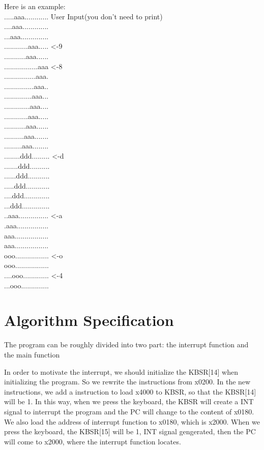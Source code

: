 \documentclass[twoside]{article}
\begin{document}
\begin{CJK*}{UTF8}{gbsn}
	Here is an example:\\
	.....aaa............ User Input(you don't need to print)\\ ....aaa............. \\...aaa..............\\ ............aaa..... <-9\\ ...........aaa...... \\.................aaa <-8\\ ................aaa. \\...............aaa.. \\..............aaa...\\ .............aaa....\\ ............aaa.....\\ ...........aaa...... \\..........aaa....... \\.........aaa........\\ ........ddd......... <-d\\ .......ddd..........\\ ......ddd...........\\ .....ddd............ \\....ddd.............\\ ...ddd.............. \\..aaa............... <-a \\.aaa................\\ aaa.................\\ aaa................. \\ooo................. <-o\\ ooo.................\\ ....ooo............. <-4\\ ...ooo..............\\
	
	\section{Algorithm Specification}
	The program can be roughly divided into two part: the interrupt function and the main function
	
	In order to motivate the interrupt, we should initialize the KBSR[14] when initializing the program. So we rewrite the instructions from x0200. In the new instructions, we add a instruction to load x4000 to KBSR, so that the KBSR[14] will be 1. In this way, when we press the keyboard, the KBSR will create a INT signal to interrupt the program and the PC will change to the content of x0180. We also load the address of interrupt function to x0180, which is x2000. When we press the keyboard, the KBSR[15] will be 1, INT signal gengerated, then the PC will come to x2000, where the interrupt function locates.
	

\end{CJK*}
\end{document}
